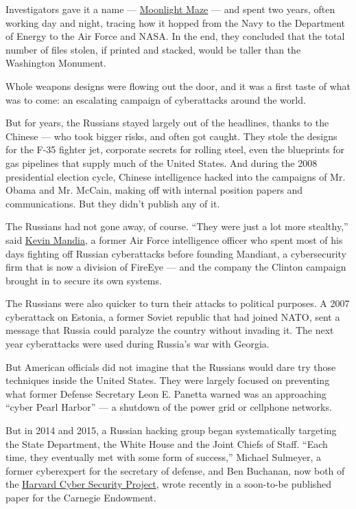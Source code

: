Investigators gave it a name ---
\href{https://medium.com/@chris_doman/the-first-sophistiated-cyber-attacks-how-operation-moonlight-maze-made-history-2adb12cc43f7\#.ghd5tn5cf}{Moonlight
Maze} --- and spent two years, often working day and night, tracing how
it hopped from the Navy to the Department of Energy to the Air Force and
NASA. In the end, they concluded that the total number of files stolen,
if printed and stacked, would be taller than the Washington Monument.

Whole weapons designs were flowing out the door, and it was a first
taste of what was to come: an escalating campaign of cyberattacks around
the world.

But for years, the Russians stayed largely out of the headlines, thanks
to the Chinese --- who took bigger risks, and often got caught. They
stole the designs for the F-35 fighter jet, corporate secrets for
rolling steel, even the blueprints for gas pipelines that supply much of
the United States. And during the 2008 presidential election cycle,
Chinese intelligence hacked into the campaigns of Mr. Obama and Mr.
McCain, making off with internal position papers and communications. But
they didn't publish any of it.

The Russians had not gone away, of course. ``They were just a lot more
stealthy,'' said
\href{https://www.fireeye.com/company/leadership.html}{Kevin Mandia}, a
former Air Force intelligence officer who spent most of his days
fighting off Russian cyberattacks before founding Mandiant, a
cybersecurity firm that is now a division of FireEye --- and the company
the Clinton campaign brought in to secure its own systems.

The Russians were also quicker to turn their attacks to political
purposes. A 2007 cyberattack on Estonia, a former Soviet republic that
had joined NATO, sent a message that Russia could paralyze the country
without invading it. The next year cyberattacks were used during
Russia's war with Georgia.

But American officials did not imagine that the Russians would dare try
those techniques inside the United States. They were largely focused on
preventing what former Defense Secretary Leon E. Panetta warned was an
approaching ``cyber Pearl Harbor'' --- a shutdown of the power grid or
cellphone networks.

But in 2014 and 2015, a Russian hacking group began systematically
targeting the State Department, the White House and the Joint Chiefs of
Staff. ``Each time, they eventually met with some form of success,''
Michael Sulmeyer, a former cyberexpert for the secretary of defense, and
Ben Buchanan, now both of the
\href{http://belfercenter.ksg.harvard.edu/project/69/cyber_security_project.html}{Harvard
Cyber Security Project}, wrote recently in a soon-to-be published paper
for the Carnegie Endowment.


